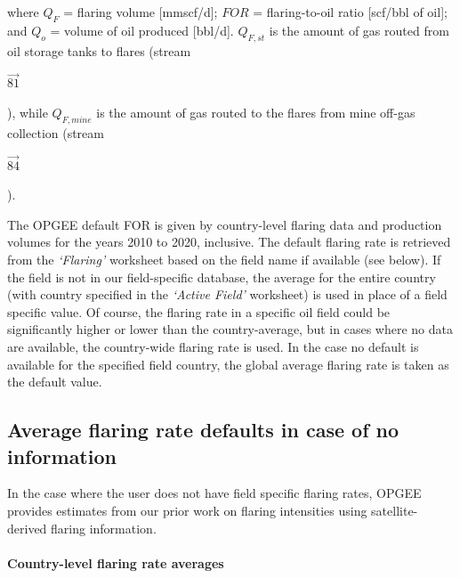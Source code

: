 \documentclass[11pt]{report}
\newcommand{\sheet}[1]{\textit{`{#1}'}}
\newcommand{\stream}[1]{\begin{footnotesize}{\textcolor{stanford}{$\overrightarrow{#1}$}}\end{footnotesize}}
\begin{document}
where $Q_{F}$ = flaring volume [mmscf/d]; $FOR$ = flaring-to-oil ratio [scf/bbl of oil]; and $Q_{o}$ = volume of oil produced [bbl/d]. $Q_{F,st}$ is the amount of gas routed from oil storage tanks to flares (stream \stream{81}), while $Q_{F,mine}$ is the amount of gas routed to the flares from mine off-gas collection (stream \stream{84}).

The OPGEE default FOR is given by country-level flaring data \cite{NOAA2010} and production volumes \cite{EIA2010} for the years 2010 to 2020, inclusive.  The default flaring rate is retrieved from the \sheet{Flaring} worksheet based on the field name if available (see below). If the field is not in our field-specific database, the average for the entire country (with country specified in the \sheet{Active Field} worksheet) is used in place of a field specific value. Of course, the flaring rate in a specific oil field could be significantly higher or lower than the country-average, but in cases where no data are available, the country-wide flaring rate is used. In the case no default is available for the specified field country, the global average flaring rate is taken as the default value.


\subsection{Average flaring rate defaults in case of no information}

In the case where the user does not have field specific flaring rates, OPGEE provides estimates from our prior work on flaring intensities using satellite-derived flaring information. 

\paragraph{Country-level flaring rate averages}
\end{document}
